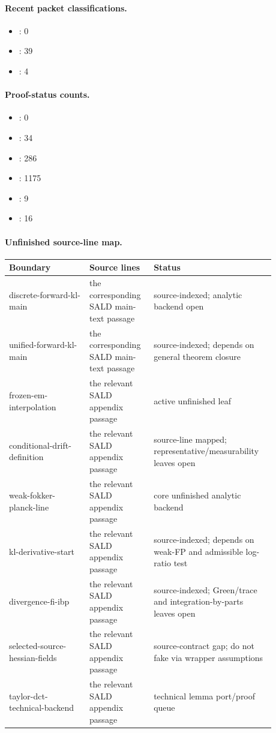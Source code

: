\paragraph{Recent packet classifications.}
\begin{itemize}
\item {}: 0
\item {}: 39
\item {}: 4
\end{itemize}

\paragraph{Proof-status counts.}
\begin{itemize}
\item {}: 0
\item {}: 34
\item {}: 286
\item {}: 1175
\item {}: 9
\item {}: 16
\end{itemize}

\paragraph{Unfinished source-line map.}
\begin{center}
\begin{tabular}{p{0.28\linewidth}p{0.22\linewidth}p{0.38\linewidth}}
\toprule
Boundary & Source lines & Status \\
\midrule
discrete-forward-kl-main & the corresponding SALD main-text passage & source-indexed; analytic backend open \\
unified-forward-kl-main & the corresponding SALD main-text passage & source-indexed; depends on general theorem closure \\
frozen-em-interpolation & the relevant SALD appendix passage & active unfinished leaf \\
conditional-drift-definition & the relevant SALD appendix passage & source-line mapped; representative/measurability leaves open \\
weak-fokker-planck-line & the relevant SALD appendix passage & core unfinished analytic backend \\
kl-derivative-start & the relevant SALD appendix passage & source-indexed; depends on weak-FP and admissible log-ratio test \\
divergence-fi-ibp & the relevant SALD appendix passage & source-indexed; Green/trace and integration-by-parts leaves open \\
selected-source-hessian-fields & the relevant SALD appendix passage & source-contract gap; do not fake via wrapper assumptions \\
taylor-dct-technical-backend & the relevant SALD appendix passage & technical lemma port/proof queue \\
\bottomrule
\end{tabular}
\end{center}


